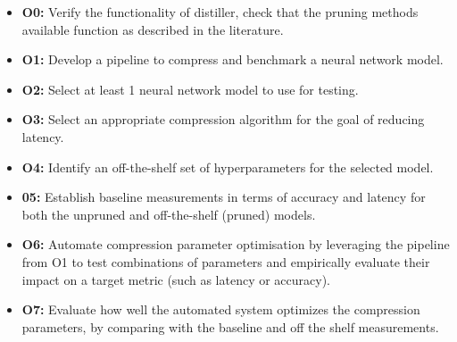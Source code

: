 \documentclass[../Dissertation.tex]{subfiles}
\begin{document}
\begin{itemize}
    \item \textbf{O0:}\label{obj:VerifyComp} Verify the functionality of distiller, check that the pruning methods available function as described in the literature.
    \item \textbf{O1:}\label{obj:BuildPipeline} Develop a pipeline to compress and benchmark a neural network model.
    \item \textbf{O2:}\label{obj:ModelSel} Select at least 1 neural network model to use for testing.
    \item \textbf{O3:}\label{obj:SelCompress} Select an appropriate compression algorithm for the goal of reducing latency.
    \item \textbf{O4:}\label{obj:OTSparams} Identify an off-the-shelf set of hyperparameters for the selected model.
    \item \textbf{05:}\label{obj:baselines} Establish baseline measurements in terms of accuracy and latency for both the unpruned and off-the-shelf (pruned) models. 
    \item \textbf{O6:}\label{obj:AutoParams} Automate compression parameter optimisation by leveraging the pipeline from O1 to test combinations of parameters and empirically evaluate their impact on a target metric (such as latency or accuracy). 
    \item \textbf{O7:}\label{obj:EvaluateResutls} Evaluate how well the automated system optimizes the compression parameters, by comparing with the baseline and off the shelf measurements.

\end{itemize}
\end{document}
